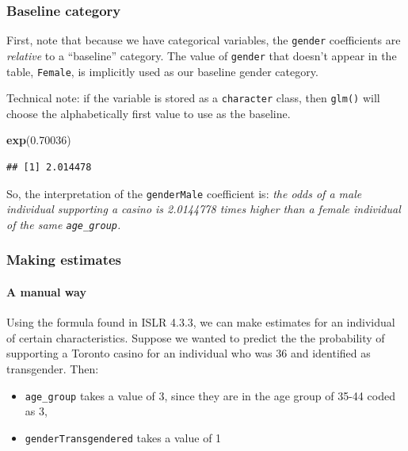 \documentclass[
]{book}
\newenvironment{Shaded}{\begin{snugshade}}{\end{snugshade}}
\newcommand{\FloatTok}[1]{\textcolor[rgb]{0.00,0.00,0.81}{#1}}
\newcommand{\KeywordTok}[1]{\textcolor[rgb]{0.13,0.29,0.53}{\textbf{#1}}}
\newcommand{\NormalTok}[1]{#1}
\providecommand{\tightlist}{%
  \setlength{\itemsep}{0pt}\setlength{\parskip}{0pt}}
\begin{document}
\hypertarget{baseline-category}{%
\subsubsection{Baseline category}\label{baseline-category}}

First, note that because we have categorical variables, the \texttt{gender} coefficients are \emph{relative} to a ``baseline'' category. The value of \texttt{gender} that doesn't appear in the table, \texttt{Female}, is implicitly used as our baseline gender category.

Technical note: if the variable is stored as a \texttt{character} class, then \texttt{glm()} will choose the alphabetically first value to use as the baseline.

\begin{Shaded}
\begin{Highlighting}[]
\KeywordTok{exp}\NormalTok{(}\FloatTok{0.70036}\NormalTok{)}
\end{Highlighting}
\end{Shaded}

\begin{verbatim}
## [1] 2.014478
\end{verbatim}

So, the interpretation of the \texttt{genderMale} coefficient is: \emph{the odds of a male individual supporting a casino is 2.0144778 times higher than a female individual of the same \texttt{age\_group}.}

\hypertarget{making-estimates}{%
\subsubsection{Making estimates}\label{making-estimates}}

\hypertarget{a-manual-way}{%
\paragraph{A manual way}\label{a-manual-way}}

Using the formula found in ISLR 4.3.3, we can make estimates for an individual of certain characteristics. Suppose we wanted to predict the the probability of supporting a Toronto casino for an individual who was 36 and identified as transgender. Then:

\begin{itemize}
\tightlist
\item
  \texttt{age\_group} takes a value of 3, since they are in the age group of 35-44 coded as 3,
\item
  \texttt{genderTransgendered} takes a value of 1
\end{itemize}
\end{document}
